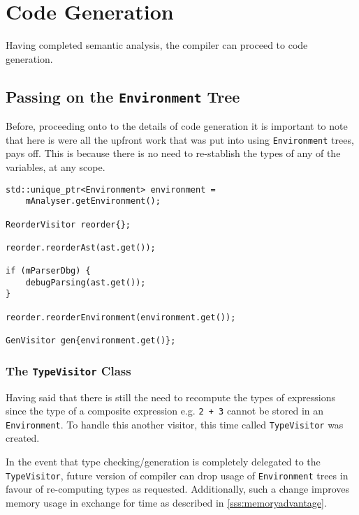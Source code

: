 \section{Code Generation}

Having completed semantic analysis, the compiler
can proceed to code generation.

\subsection{Passing on the \texttt{Environment} Tree}

Before, proceeding onto to the details of code generation it is
important to note that here is were all the upfront work that
was put into using \texttt{Environment} trees, pays off. This is
because there is no need to re-stablish the types of any of the
variables, at any scope.

\begin{lstlisting}[caption={Getting the global environment from
the \texttt{AnalysisVisitor} and passing it on for reordering
and code generation (runner/Runner.cpp).}]
std::unique_ptr<Environment> environment =
    mAnalyser.getEnvironment();

ReorderVisitor reorder{};

reorder.reorderAst(ast.get());

if (mParserDbg) {
    debugParsing(ast.get());
}

reorder.reorderEnvironment(environment.get());

GenVisitor gen{environment.get()};
\end{lstlisting}

\subsubsection{The \texttt{TypeVisitor} Class}

Having said that there is still the need to recompute the types
of expressions since the type of a composite expression e.g.
\texttt{2 + 3} cannot be stored in an \texttt{Environment}. To
handle this another visitor, this time called
\texttt{TypeVisitor} was created.

\begin{todo}
In the event that type checking/generation is completely
delegated to the \texttt{TypeVisitor}, future version of
compiler can drop usage of \texttt{Environment} trees in favour
of re-computing types as requested. Additionally, such a change
improves memory usage in exchange for time as described in
\ref{sss:memoryadvantage}.
\end{todo}

